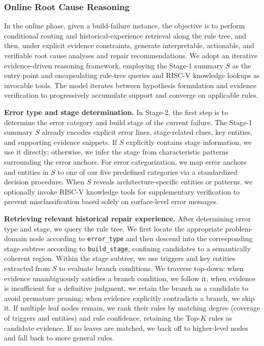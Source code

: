 \documentclass[sigconf,anonymous]{acmart}
\begin{document}
\subsubsection{Online Root Cause Reasoning}

In the online phase, given a build-failure instance, the objective is to perform conditional routing and historical-experience retrieval along the rule tree, and then, under explicit evidence constraints, generate interpretable, actionable, and verifiable root cause analyses and repair recommendations. We adopt an iterative evidence-driven reasoning framework, employing the Stage-1 summary $S$ as the entry point and encapsulating rule-tree queries and RISC-V knowledge lookups as invocable tools. The model iterates between hypothesis formulation and evidence verification to progressively accumulate support and converge on applicable rules.

\textbf{Error type and stage determination.} In Stage-2, the first step is to determine the error category and build stage of the current failure. The Stage-1 summary $S$ already encodes explicit error lines, stage-related clues, key entities, and supporting evidence snippets. If $S$ explicitly contains stage information, we use it directly; otherwise, we infer the stage from characteristic patterns surrounding the error anchors. For error categorization, we map error anchors and entities in $S$ to one of our five predefined categories via a standardized decision procedure. When $S$ reveals architecture-specific entities or patterns, we optionally invoke RISC-V knowledge tools for supplementary verification to prevent misclassification based solely on surface-level error messages.

\textbf{Retrieving relevant historical repair experience.} After determining error type and stage, we query the rule tree. We first locate the appropriate problem-domain node according to \texttt{error\_type} and then descend into the corresponding stage subtree according to \texttt{build\_stage}, confining candidates to a semantically coherent region. Within the stage subtree, we use triggers and key entities extracted from $S$ to evaluate branch conditions. We traverse top-down: when evidence unambiguously satisfies a branch condition, we follow it; when evidence is insufficient for a definitive judgment, we retain the branch as a candidate to avoid premature pruning; when evidence explicitly contradicts a branch, we skip it. If multiple leaf nodes remain, we rank their rules by matching degree (coverage of triggers and entities) and rule confidence, retaining the Top-$K$ rules as candidate evidence. If no leaves are matched, we back off to higher-level nodes and fall back to more general rules.
\end{document}
